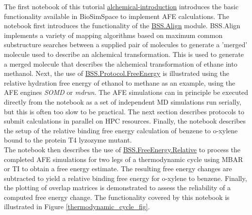 The first notebook of this tutorial \href{https://github.com/OpenBioSim/biosimspace_tutorials/blob/main/04_fep/01_intro_to_alchemy/alchemical_introduction.ipynb}{alchemical-introduction} introduces the basic functionality available in BioSimSpace to implement AFE calculations. 
The notebook first introduces the functionality of the \href{https://biosimspace.openbiosim.org/api/index_Align.html}{BSS.Align} module. BSS.Align implements a variety of mapping algorithms based on maximum common substructure searches between a supplied pair of molecules to generate a 'merged' molecule used to describe an alchemical transformation. This is used to generate a merged molecule that describes the alchemical transformation of ethane into methanol.
Next, the use of \href{https://biosimspace.openbiosim.org/api/generated/BioSimSpace.Protocol.FreeEnergy.html#BioSimSpace.Protocol.FreeEnergy}{BSS.Protocol.FreeEnergy} is illustrated using the relative hydration free energy of ethanol to methane as an example, using the AFE engines \emph{SOMD}\cite{Calabr2016} or \emph{mdrun}. 
The AFE simulations can in principle be executed directly from the notebook as a set of independent MD simulations run serially, but this is often too slow to be practical. The next section describes protocols to submit calculations in parallel on HPC resources.
Finally, the notebook describes the setup of the relative binding free energy calculation of benzene to o-xylene bound to the protein T4 lyzozyme mutant. 
\\
The notebook then describes the use of \href{https://biosimspace.openbiosim.org/api/generated/BioSimSpace.FreeEnergy.Relative.html#}{BSS.FreeEnergy.Relative} to process the completed AFE simulations for two legs of a thermodynamic cycle using MBAR or TI to obtain a free energy estimate. The resulting free energy changes are subtracted to yield a relative binding free energy for o-xylene to benzene. Finally, the plotting of overlap matrices is demonstrated to assess the reliability of a computed free energy change. The functionality covered by this notebook is illustrated in Figure \ref{thermodynamic_cycle_fig}.

